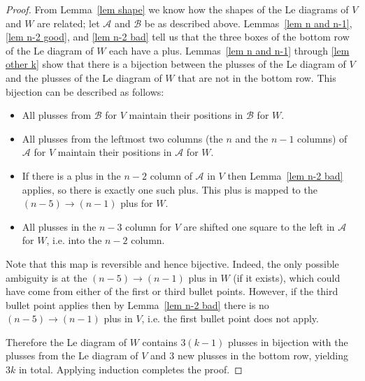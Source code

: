 \documentclass[11pt]{article}
\theoremstyle{remark}
\theoremstyle{definition}
\begin{document}
\begin{proof}
  From Lemma~\ref{lem shape} we know how the shapes of the Le diagrams of $V$ and $W$ are related; let $\mathcal{A}$ and $\mathcal{B}$ be as described above.  Lemmas~\ref{lem n and n-1}, \ref{lem n-2 good}, and \ref{lem n-2 bad} tell us that the three boxes of the bottom row of the Le diagram of $W$ each have a plus.  Lemmas~\ref{lem n and n-1} through \ref{lem other k} show that there is a bijection between the plusses of the Le diagram of $V$ and the plusses of the Le diagram of $W$ that are not in the bottom row.  This bijection can be described as follows:
  \begin{itemize}
  \item All plusses from $\mathcal{B}$ for $V$ maintain their positions in $\mathcal{B}$ for $W$.
  \item All plusses from the leftmost two columns (the $n$ and the $n-1$ columns) of $\mathcal{A}$ for $V$ maintain their positions in $\mathcal{A}$ for $W$.
  \item If there is a plus in the $n-2$ column of $\mathcal{A}$ in $V$ then Lemma~\ref{lem n-2 bad} applies, so there is exactly one such plus.  This plus is mapped to the $(n-5)\rightarrow (n-1)$ plus for $W$.
  \item All plusses in the $n-3$ column for $V$ are shifted one square to the left in $\mathcal{A}$ for $W$, i.e. into the $n-2$ column.
  \end{itemize}
  Note that this map is reversible and hence bijective. Indeed, the only possible ambiguity is at the $(n-5)\rightarrow (n-1)$ plus in $W$ (if it exists), which could have come from either of the first or third bullet points. However, if the third bullet point applies then by Lemma~\ref{lem n-2 bad} there is no $(n-5)\rightarrow (n-1)$ plus in $V$, i.e. the first bullet point does not apply. 




Therefore the Le diagram of $W$ contains $3(k-1)$ plusses in bijection with the plusses from the Le diagram of $V$ and 3 new plusses in the bottom row, yielding $3k$ in total. Applying induction completes the proof.
\end{proof}
\end{document}
